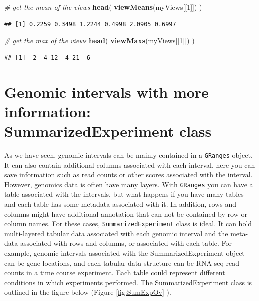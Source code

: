 \documentclass[12pt,]{krantz}
\newenvironment{Shaded}{\begin{snugshade}}{\end{snugshade}}
\newcommand{\CommentTok}[1]{\textcolor[rgb]{0.56,0.35,0.01}{\textit{#1}}}
\newcommand{\DecValTok}[1]{\textcolor[rgb]{0.00,0.00,0.81}{#1}}
\newcommand{\KeywordTok}[1]{\textcolor[rgb]{0.13,0.29,0.53}{\textbf{#1}}}
\newcommand{\NormalTok}[1]{#1}
\begin{document}
\begin{Shaded}
\begin{Highlighting}[]
\CommentTok{# get the mean of the views}
\KeywordTok{head}\NormalTok{(}
  \KeywordTok{viewMeans}\NormalTok{(myViews[[}\DecValTok{1}\NormalTok{]])}
\NormalTok{)}
\end{Highlighting}
\end{Shaded}

\begin{verbatim}
## [1] 0.2259 0.3498 1.2244 0.4998 2.0905 0.6997
\end{verbatim}

\begin{Shaded}
\begin{Highlighting}[]
\CommentTok{# get the max of the views}
\KeywordTok{head}\NormalTok{(}
  \KeywordTok{viewMaxs}\NormalTok{(myViews[[}\DecValTok{1}\NormalTok{]])}
\NormalTok{)}
\end{Highlighting}
\end{Shaded}

\begin{verbatim}
## [1]  2  4 12  4 21  6
\end{verbatim}

\hypertarget{genomic-intervals-with-more-information-summarizedexperiment-class}{%
\section{Genomic intervals with more information: SummarizedExperiment class}\label{genomic-intervals-with-more-information-summarizedexperiment-class}}

As we have seen, genomic intervals can be mainly contained in a \texttt{GRanges} object.
It can also contain additional columns associated with each interval, here
you can save information such as read counts or other scores associated with the
interval. However,
genomics data is often have many layers. With \texttt{GRanges} you can have a table
associated with the intervals, but what happens if you have many tables and each
table has some metadata associated with it. In addition, rows and columns might
have additional annotation that can not be contained by row or column names.
For these cases, \texttt{SummarizedExperiment} class is ideal. It can hold multi-layered
tabular data associated with each genomic interval and the meta-data associated with
rows and columns, or associated with each table. For example, genomic intervals
associated with the SummarizedExperiment object can be gene locations, and
each tabular data structure can be RNA-seq read counts in a time course experiment.
Each table could represent different conditions in which experiments performed.
The SummarizedExperiment class is outlined in the figure below (Figure \ref{fig:SumExpOv} ).
\end{document}
